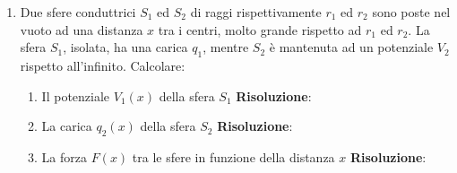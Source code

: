 \documentclass{book}
\begin{document}
\begin{enumerate}
    \item Due sfere conduttrici $S_1$ ed $S_2$ di raggi rispettivamente $r_1$ ed $r_2$ sono poste nel vuoto ad una distanza $x$ tra i centri, molto grande rispetto ad $ r_1$ ed $r_2$. La sfera $S_1$, isolata, ha una carica $q_1$, mentre $S_2$ è mantenuta ad un potenziale $V_2$ rispetto all'infinito. Calcolare:
    \begin{enumerate}
        \item Il potenziale $V_1(x)$ della sfera $S_1$ \newline
        \textbf{Risoluzione}: 
        \item La carica $q_2(x)$ della sfera $S_2$ \newline
        \textbf{Risoluzione}: 
        \item La forza $F(x)$ tra le sfere in funzione della distanza $x$ \newline
        \textbf{Risoluzione}: 
    \end{enumerate}


\end{enumerate}
\end{document}

